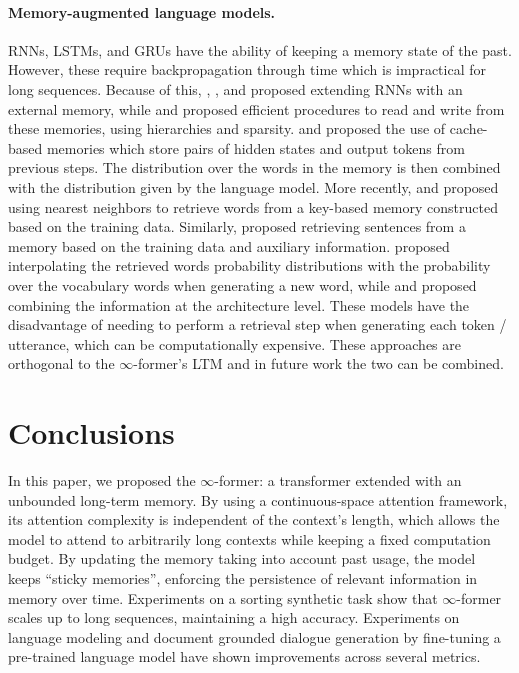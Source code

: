 \documentclass[11pt]{article}
\begin{document}
\paragraph{Memory-augmented language models. }
RNNs, LSTMs, and GRUs \citep{hochreiter1997long,cho2014properties} have the ability of keeping a memory state of the past.  However, these require backpropagation through time which is impractical for long sequences.
Because of this, \citet{graves2014neural}, \citet{weston2014memory}, \citet{joulin2015inferring} and \citet{grefenstette2015learning} proposed extending RNNs with an external memory, while \citet{chandar2016hierarchical} and \citet{rae2016scaling} proposed efficient procedures to read and write from these memories, using hierarchies and sparsity.
\citet{grave2016improving} and \citet{merity2016pointer} proposed the use of cache-based memories which store pairs of hidden states and output tokens from previous steps. The distribution over the words in the memory is then combined with the distribution given by the language model.
More recently, \citet{khandelwal2019generalization} and \citet{yogatama2021adaptive} proposed using nearest neighbors to retrieve words from a key-based memory constructed based on the training data. Similarly, \citet{fan2021augmenting} proposed retrieving sentences from a memory based on the training data and auxiliary information. \citet{khandelwal2019generalization} proposed interpolating the retrieved words probability distributions with the probability over the vocabulary words when generating a new word, while \citet{yogatama2021adaptive} and \citet{fan2021augmenting} proposed combining the information at the architecture level. 
These models have the disadvantage of needing to perform a retrieval step when generating each token / utterance, which can be computationally expensive. 
These approaches are orthogonal to the \mbox{$\infty$-former}'s LTM and in future work the two can be combined.


\section{Conclusions}
In this paper, we proposed the $\infty$-former: a transformer extended with an unbounded long-term memory. By using a continuous-space attention framework, its attention complexity is independent of the context's length, 
which allows the model to attend to arbitrarily long contexts while keeping a fixed computation budget. 
By updating the memory taking into account past usage, the model keeps ``sticky memories'', enforcing the persistence of relevant information in memory over time. 
Experiments on a sorting synthetic task show that $\infty$-former scales up to long sequences, maintaining a high accuracy. Experiments on language modeling and document grounded dialogue generation by fine-tuning a pre-trained language model have shown improvements across several metrics.
\end{document}
